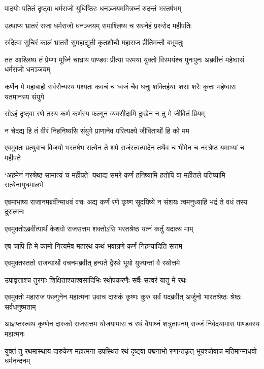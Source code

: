 \twolineshloka
{पादयोः पतितं दृष्ट्वा धर्मराजो युधिष्ठिरः}
{धनञ्जयममित्रघ्नं रुदन्तं भरतर्षभम्}


\twolineshloka
{उत्थाप्य भ्रातरं राजा धर्मराजो धनञ्जयम्}
{समाश्लिष्य च सस्नेहं प्ररुरोद महीपतिः}


\twolineshloka
{रुदित्वा सुचिरं कालं भ्रातरौ सुमहाद्युती}
{कृतशौचौ महाराज प्रीतिमन्तौ बभूवतुः}


\threelineshloka
{तत आश्लिष्य तं प्रेम्णा मूर्ध्नि चाघ्राय पाण्डवः}
{प्रीत्या परमया युक्तो विस्मयंश्च पुनःपुनः}
{अब्रवीत्तं महेष्वासं धर्मराजो धनञ्जयम्}


\threelineshloka
{कर्णेन मे महाबाहो सर्वसैन्यस्य पश्यतः}
{कवचं च ध्वजं चैव धनुः शक्तिर्हयाः शराः}
{शरैः कृत्ता महेष्वास यतमानस्य संयुगे}


\twolineshloka
{सोऽहं दृष्ट्वा रणे तस्य कर्ण कर्णस्य फल्गुन}
{व्यवसीदामि दुःखेन न तु मे जीवितं प्रियम्}


\twolineshloka
{न चेदद्य हि तं वीरं निहनिष्यसि संयुगे}
{प्राणानेव परित्यक्ष्ये जीवितार्थो हि को मम}


एवमुक्तः प्रत्युवाच विजयो भरतर्षभ
\twolineshloka
{सत्येन ते शपे राजंस्त्वत्पादेन तथैव च}
{भीमेन च नरश्रेष्ठ यमाभ्यां च महीपते}


\threelineshloka
{`अहमेनं नरश्रेष्ठ सामात्यं च महीपते'}
{यथाद्य समरे कर्णं हनिष्यामि हतोपि वा}
{महीतले पतिष्यामि सत्येनायुधमालभे}


\threelineshloka
{एवमाभाष्य राजानमब्रवीन्माधवं वचः}
{अद्य कर्णं रणे कृष्ण सूदयिष्ये न संशयः}
{त्वमनुध्याहि भद्रं ते वधं तस्य दुरात्मनः}


\twolineshloka
{एवमुक्तोऽब्रवीत्पार्थं केशवो राजसत्तम}
{शक्तोऽसि भरतश्रेष्ठ यत्नं कर्तुं यदात्थ माम्}


\twolineshloka
{एष चापि हि मे कामो नित्यमेव महारथ}
{कथं भवान्रणे कर्णं निहन्यादिति सत्तम}


\twolineshloka
{एवमुक्तस्ततो राजन्पार्थो वचनमब्रवीत्}
{हन्यते द्वैरथे भूयो युज्यन्तां वै रथोत्तमे}


\twolineshloka
{उपावृत्ताश्च तुरगाः शिक्षिताश्चाश्वसादिभिः}
{रथोपकरणैः सर्वैः सत्वरं यातु मे रथः}


\threelineshloka
{एवमुक्तो महाराज फल्गुनेन महात्मना}
{उवाच दारुकं कृष्णः कुरु सर्वं यदब्रवीत्}
{अर्जुनो भारतश्रेष्ठः श्रेष्ठः सर्वधनुष्मताम्}


\threelineshloka
{आज्ञप्तस्त्वथ कृष्णेन दारुको राजसत्तम}
{योजयामास च रथं वैयाघ्नं शत्रुतापनम्}
{सज्जं निवेदयामास पाण्डवस्य महात्मनः}


\threelineshloka
{युक्तं तु रथमास्थाय दारुकेण महात्मना}
{उपस्थितं रथं दृष्ट्वा पद्मनाभो रणान्तकृत्}
{भूयश्चोवाच मतिमान्माधवो धर्मनन्दनम्}


